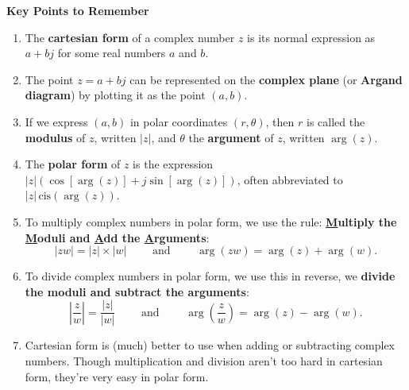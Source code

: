 \documentclass{article}
\newcommand{\cis}{\,\mathrm{cis}}
\begin{document}
\clearpage


{\bf Key Points to Remember}

\vspace{5mm}

\begin{enumerate}
\item The \textbf{cartesian form} of a complex number $z$ is its normal expression as $a+bj$ for some real numbers $a$ and $b$.
\item The point $z=a+bj$ can be represented on the \textbf{complex plane} (or \textbf{Argand diagram}) by plotting it as the point $(a,b)$.
\item If we express $(a,b)$ in polar coordinates $(r,\theta)$, then $r$ is called the \textbf{modulus} of $z$, written $|z|$, and $\theta$ the \textbf{argument} of $z$, written $\arg(z)$.
\item The \textbf{polar form} of $z$ is the expression $|z|(\cos[\arg(z)]+j\sin[\arg(z)])$, often abbreviated to $|z|\cis(\arg(z))$.
\item To multiply complex numbers in polar form, we use the rule: \textbf{\underline{M}ultiply the \underline{M}oduli and \underline{A}dd the \underline{A}rguments}:
	\[|zw|=|z|\times |w|\qquad \mbox{ and }\qquad\arg(zw)=\arg(z)+\arg(w).\]
\item To divide complex numbers in polar form, we use this in reverse, we \textbf{divide the moduli and subtract the arguments}:
	\[\left|\frac{z}{w}\right|=\frac{|z|}{|w|}\qquad\mbox{ and }\qquad \arg\left(\frac{z}{w}\right)=\arg(z)-\arg(w).\]
\item Cartesian form is (much) better to use when adding or subtracting complex numbers. Though multiplication and division aren't too hard in cartesian form, they're very easy in polar form.
\end{enumerate}
\end{document}
